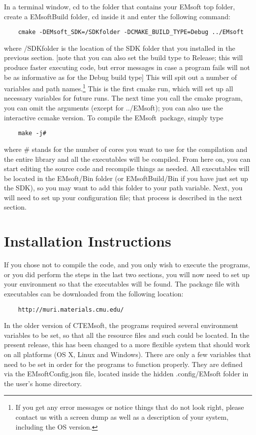 \documentclass[DIV=calc, paper=letter, fontsize=11pt]{scrartcl}	 %
\newcommand{\ctp}{\textsf{EMsoft}}
\begin{document}
In a terminal window, cd to the folder that contains your \textsf{EMsoft} top folder, create a \textsf{EMsoftBuild} folder, cd inside it and enter the following command:
\begin{verbatim}
	cmake -DEMsoft_SDK=/SDKfolder -DCMAKE_BUILD_TYPE=Debug ../EMsoft
\end{verbatim}
where /SDKfolder is the location of the SDK folder that you installed in the previous section.
[note that you can also set the build type to Release; this will produce faster executing code, but error messages in case a program fails
will not be as informative as for the Debug build type]
This will spit out a number of variables and path names.\footnote{If you get any error messages or notice things that do not look right, please contact us with a 
screen dump as well as a description of your system, including the OS version.} This is the first cmake run, which will set up all necessary variables
for future runs.  The next time you call the cmake program, you can omit the arguments (except for ../EMsoft); you can also use the interactive ccmake version.
To compile the \ctp\ package, simply type
\begin{verbatim}
	make -j#
\end{verbatim}
where \# stands for the number of cores you want to use for the compilation
and the entire library and all the executables will be compiled.  From here on, you can start editing the source code and recompile things as needed.
All executables will be located in the \textsf{EMsoft/Bin} folder (or \textsf{EMsoftBuild/Bin} if you have just set up the SDK), so you may want to add this folder to your path variable.
Next, you will need to set up your configuration file; that process is described in the next section.

\section{Installation Instructions\label{sec:todo}}
If you chose not to compile the code, and you only wish to execute the programs, or you did perform the steps in the last two sections, you will
now need to set up your environment so that the executables will be found.  The package file with executables can be downloaded from the following
location:
\begin{verbatim}
	http://muri.materials.cmu.edu/
\end{verbatim}
In the older version of CTEMsoft, the programs required several environment variables to be set, so
that all the resource files and such could be located. In the present release, this has been changed
to a more flexible system that should work on all platforms (OS X, Linux and Windows).  There are 
only a few variables that need to be set in order for the programs to function properly.  They are defined 
via the \textsf{EMsoftConfig.json} file, located inside the hidden \textsf{.config/EMsoft} folder in the user's 
home directory.
\end{document}
